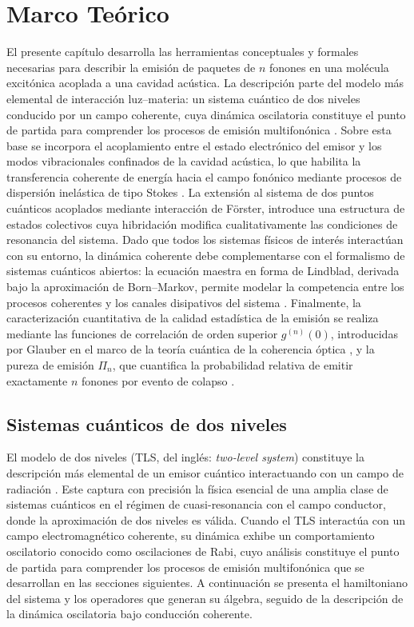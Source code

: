 \chapter{Marco Teórico}

El presente capítulo desarrolla las herramientas conceptuales y formales necesarias para describir la emisión de paquetes de $n$ fonones en una molécula excitónica acoplada a una cavidad acústica. La descripción parte del modelo más elemental de interacción luz--materia: un sistema cuántico de dos niveles conducido por un campo coherente, cuya dinámica oscilatoria constituye el punto de partida para comprender los procesos de emisión multifonónica \cite{gerry2005,fox2006}. Sobre esta base se incorpora el acoplamiento entre el estado electrónico del emisor y los modos vibracionales confinados de la cavidad acústica, lo que habilita la transferencia coherente de energía hacia el campo fonónico mediante procesos de dispersión inelástica de tipo Stokes \cite{loudon2000}. La extensión al sistema de  dos puntos cuánticos acoplados mediante interacción de Förster, introduce una estructura de estados colectivos cuya hibridación modifica cualitativamente las condiciones de resonancia del sistema. Dado que todos los sistemas físicos de interés interactúan con su entorno, la dinámica coherente debe complementarse con el formalismo de sistemas cuánticos abiertos: la ecuación maestra en forma de Lindblad, derivada bajo la aproximación de Born--Markov, permite modelar la competencia entre los procesos coherentes y los canales disipativos del sistema \cite{lindblad1976,breuerpetruccione2002}. Finalmente, la caracterización cuantitativa de la calidad estadística de la emisión se realiza mediante las funciones de correlación de orden superior $g^{(n)}(0)$, introducidas por Glauber en el marco de la teoría cuántica de la coherencia óptica \cite{glauber1963}, y la pureza de emisión $\Pi_n$, que cuantifica la probabilidad relativa de emitir exactamente $n$ fonones por evento de colapso \cite{munoz2018}.

\section{Sistemas cuánticos de dos niveles}
\label{sec:tls}

El modelo de dos niveles (TLS, del inglés: \textit{two-level system}) constituye la descripción más elemental de un emisor cuántico interactuando con un campo de radiación \cite{gerry2005,fox2006}. Este captura con precisión la física esencial de una amplia clase de sistemas cuánticos en el régimen de cuasi-resonancia con el campo conductor, donde la aproximación de dos niveles es válida. Cuando el TLS interactúa con un campo electromagnético coherente, su dinámica exhibe un comportamiento oscilatorio conocido como oscilaciones de Rabi, cuyo análisis constituye el punto de partida para comprender los procesos de emisión multifonónica que se desarrollan en las secciones siguientes. A continuación se presenta el hamiltoniano del sistema y los operadores que generan su álgebra, seguido de la descripción de la dinámica oscilatoria bajo conducción coherente.

